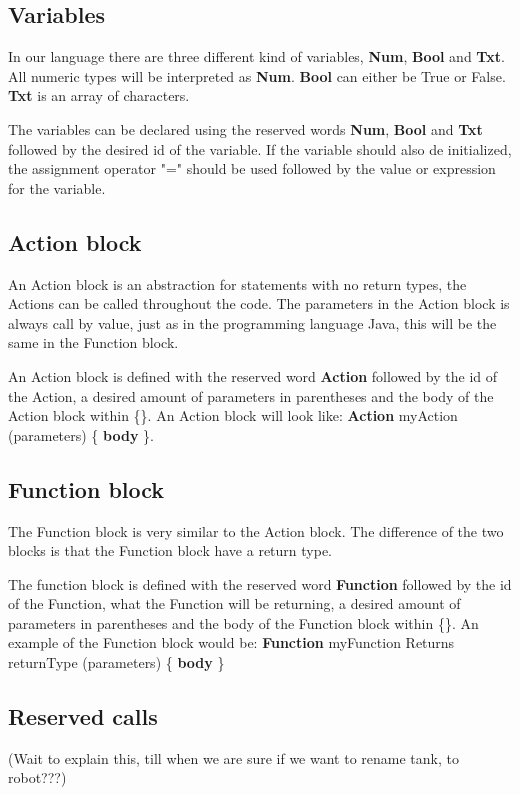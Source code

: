 \subsection{Variables}
In our language there are three different kind of variables, \textbf{Num}, \textbf{Bool} and \textbf{Txt}. All numeric types will be interpreted as \textbf{Num}. \textbf{Bool} can either be True or False. \textbf{Txt} is an array of characters.

\begin{defi}
The variables can be declared using the reserved words \textbf{Num}, \textbf{Bool} and \textbf{Txt} followed by the desired id of the variable. If the variable should also de initialized,  the assignment operator "=" should be used followed by the value or expression for the variable. 
\end{defi}
\subsection{Action block}
An Action block is an abstraction for statements with no return types, the Actions can be called throughout the code. The parameters in the Action block is always call by value, just as in the programming language Java, this will be the same in the Function block.

\begin{defi}
An Action block is defined with the reserved word \textbf{Action} followed by the id of the Action, a desired amount of parameters in parentheses and the body of the Action block within \{\}.
An Action block will look like: \textbf{Action} myAction (parameters) \{ \textbf{body} \}.
\end{defi}
\subsection{Function block}
The Function block is very similar to the Action block. The difference of the two blocks is that the Function block have a return type. 

\begin{defi}
The function block is defined with the reserved word \textbf{Function} followed by the id of the Function, what the Function will be returning, a desired amount of parameters in parentheses and the body of the Function block within \{\}.
An example of the Function block would be: \textbf{Function} myFunction Returns returnType (parameters) \{ \textbf{body} \}
\end{defi}
\subsection{Reserved calls}
(Wait to explain this, till when we are sure if we want to rename tank, to robot???)

